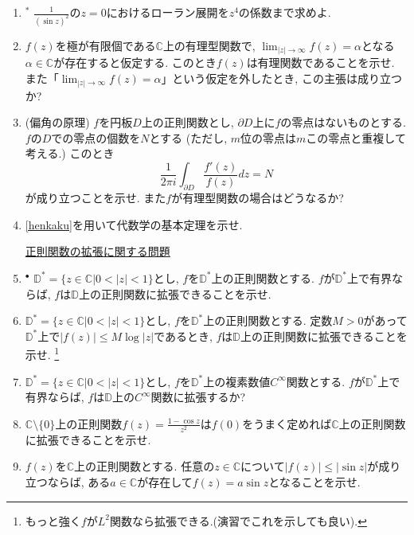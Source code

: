 \documentclass[dvipdfmx,a4paper,11pt]{article}
\newcommand{\C}{\mathbb{C}}
\newcommand{\D}{\mathbb{D}}
\theoremstyle{definition}
\begin{document}
\begin{enumerate}[label=\textbf{問}4.\arabic*]
\item  $^{*}$ $\frac{1}{(\sin z)^2}$の$z=0$におけるローラン展開を$z^4$の係数まで求めよ.

 \item $f(z)$を極が有限個である$\C$上の有理型関数で, $\lim_{|z| \rightarrow \infty} f(z)= \alpha $となる$\alpha \in \C$が存在すると仮定する. このとき$f(z)$は有理関数であることを示せ.
   また「$\lim_{|z| \rightarrow \infty} f(z)= \alpha $」という仮定を外したとき, この主張は成り立つか?
       
  \item \label{henkaku} (偏角の原理) $f$を円板$D$上の正則関数とし, $\partial D$上に$f$の零点はないものとする. 
  $f$の$D$での零点の個数を$N$とする (ただし, $m$位の零点は$m$この零点と重複して考える.)
  このとき
  $$
  \frac{1}{2 \pi i} \int_{\partial D} \frac{f' (z)}{f(z)} dz = N
  $$
  が成り立つことを示せ. また$f$が有理型関数の場合はどうなるか?
  \item \ref{henkaku}を用いて代数学の基本定理を示せ.
  
\vspace{12pt}
\hspace{-36pt}\underline{正則関数の拡張に関する問題}



 \item \label{yukai} $^{\bullet}$  $\D^{*}=\{z \in \C | 0 < |z| <1\}$とし, $f$を$\D^{*}$上の正則関数とする. 
 $f$が$\D^{*}$上で有界ならば, $f$は$\D$上の正則関数に拡張できることを示せ. 
 
  \item $\D^{*}=\{z \in \C | 0 < |z| <1\}$とし, 
  $f$を$\D^{*}$上の正則関数とする. %
 定数$M>0$があって$\D^{*}$上で$|f(z)| \le M \log |z|$であるとき, $f$は$\D$上の正則関数に拡張できることを示せ. \footnote{もっと強く$f$が$L^2$関数なら拡張できる.(演習でこれを示しても良い).}
 
 
 \item $\D^{*}=\{z \in \C | 0 < |z| <1\}$とし, $f$を$\D^{*}$上の複素数値$C^{\infty}$関数とする. 
 $f$が$\D^{*}$上で有界ならば, $f$は$\D$上の$C^{\infty}$関数に拡張するか?
 
  \item $\C \setminus \{ 0\}$上の正則関数$f(z)=\frac{1 - \cos z}{z^2}$は$f(0)$をうまく定めれば$\C$上の正則関数に拡張できることを示せ. 
  
 \item $f(z)$を$\C$上の正則関数とする. 任意の$z \in \C$について$|f(z)| \le |\sin z|$が成り立つならば, ある$a \in \C$が存在して$f(z) = a \sin z$となることを示せ. 
 



\end{enumerate}
\end{document}
